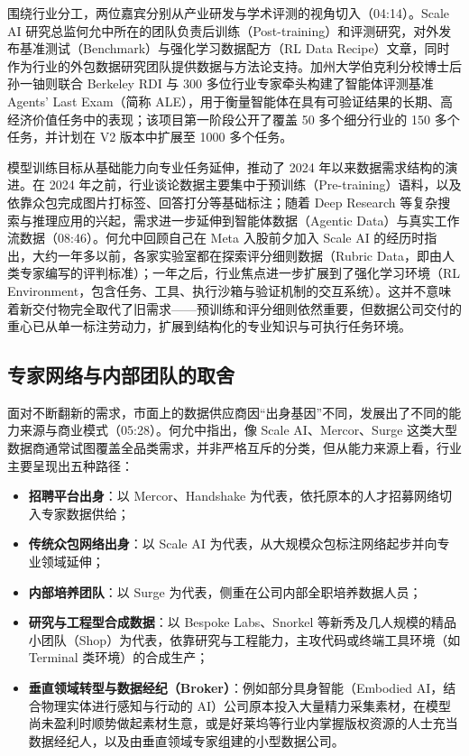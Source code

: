 \documentclass[UTF8,a4paper,11pt,fontset=fandol]{ctexart}
\begin{document}
围绕行业分工，两位嘉宾分别从产业研发与学术评测的视角切入（04:14）。Scale AI 研究总监何允中所在的团队负责后训练（Post-training）和评测研究，对外发布基准测试（Benchmark）与强化学习数据配方（RL Data Recipe）文章，同时作为行业的外包数据研究团队提供数据与方法论支持。加州大学伯克利分校博士后孙一铀则联合 Berkeley RDI 与 300 多位行业专家牵头构建了智能体评测基准 Agents' Last Exam（简称 ALE），用于衡量智能体在具有可验证结果的长期、高经济价值任务中的表现；该项目第一阶段公开了覆盖 50 多个细分行业的 150 多个任务，并计划在 V2 版本中扩展至 1000 多个任务。

模型训练目标从基础能力向专业任务延伸，推动了 2024 年以来数据需求结构的演进。在 2024 年之前，行业谈论数据主要集中于预训练（Pre-training）语料，以及依靠众包完成图片打标签、回答打分等基础标注；随着 Deep Research 等复杂搜索与推理应用的兴起，需求进一步延伸到智能体数据（Agentic Data）与真实工作流数据（08:46）。何允中回顾自己在 Meta 入股前夕加入 Scale AI 的经历时指出，大约一年多以前，各家实验室都在探索评分细则数据（Rubric Data，即由人类专家编写的评判标准）；一年之后，行业焦点进一步扩展到了强化学习环境（RL Environment，包含任务、工具、执行沙箱与验证机制的交互系统）。这并不意味着新交付物完全取代了旧需求——预训练和评分细则依然重要，但数据公司交付的重心已从单一标注劳动力，扩展到结构化的专业知识与可执行任务环境。

\subsection{专家网络与内部团队的取舍}
面对不断翻新的需求，市面上的数据供应商因“出身基因”不同，发展出了不同的能力来源与商业模式（05:28）。何允中指出，像 Scale AI、Mercor、Surge 这类大型数据商通常试图覆盖全品类需求，并非严格互斥的分类，但从能力来源上看，行业主要呈现出五种路径：
\begin{itemize}
\item \textbf{招聘平台出身}：以 Mercor、Handshake 为代表，依托原本的人才招募网络切入专家数据供给；
\item \textbf{传统众包网络出身}：以 Scale AI 为代表，从大规模众包标注网络起步并向专业领域延伸；
\item \textbf{内部培养团队}：以 Surge 为代表，侧重在公司内部全职培养数据人员；
\item \textbf{研究与工程型合成数据}：以 Bespoke Labs、Snorkel 等新秀及几人规模的精品小团队（Shop）为代表，依靠研究与工程能力，主攻代码或终端工具环境（如 Terminal 类环境）的合成生产；
\item \textbf{垂直领域转型与数据经纪（Broker）}：例如部分具身智能（Embodied AI，结合物理实体进行感知与行动的 AI）公司原本投入大量精力采集素材，在模型尚未盈利时顺势做起素材生意，或是好莱坞等行业内掌握版权资源的人士充当数据经纪人，以及由垂直领域专家组建的小型数据公司。
\end{itemize}
\end{document}
